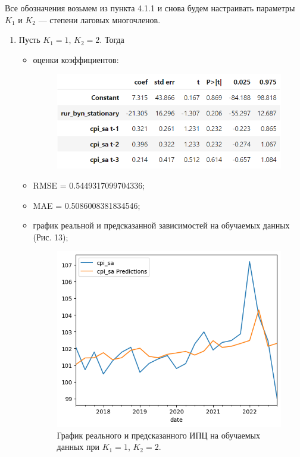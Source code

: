 \documentclass[a4paper, 14pt]{extarticle}
\begin{document}
		Все обозначения возьмем из пункта 4.1.1 и снова будем настраивать параметры $K_1$ и $K_2$ --- степени лаговых многочленов.	
		\begin{enumerate}
			\item Пусть $K_1 = 1$, $K_2 = 2$. Тогда
			\begin{itemize}
				\item оценки коэффициентов:
				\begin{figure}[h!]
					\centering
					\includegraphics[scale=1.1]{images/tab_9}
					\label{fig:tab9}
				\end{figure}
				
				\item RMSE = 0.5449317099704336;
				\item MAE = 0.5086008381834546;
				
				\item график реальной и предсказанной зависимостей на обучаемых данных  (Рис. 13); 
				\begin{figure}[h!]
					\centering
					\includegraphics[scale=0.8]{images/pic_13}
					\caption[Рис. 13]{График реального и предсказанного ИПЦ на обучаемых данных при $K_1 = 1$, $K_2 = 2$.}
					\label{fig:pic13}
				\end{figure}
				

\end{itemize}
\end{enumerate}
\end{document}
